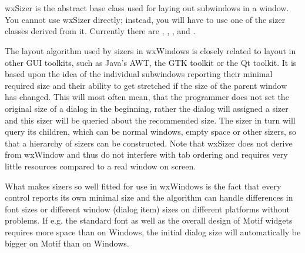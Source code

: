 \section{}\label{wxsizer}

wxSizer is the abstract base class used for laying out subwindows in a window. You
cannot use wxSizer directly; instead, you will have to use one of the sizer
classes derived from it. Currently there are , 
,
,  
and .

The layout algorithm used by sizers in wxWindows is closely related to layout
in other GUI toolkits, such as Java's AWT, the GTK toolkit or the Qt toolkit. It is
based upon the idea of the individual subwindows reporting their minimal required
size and their ability to get stretched if the size of the parent window has changed.
This will most often mean, that the programmer does not set the original size of
a dialog in the beginning, rather the dialog will assigned a sizer and this sizer
will be queried about the recommended size. The sizer in turn will query its
children, which can be normal windows, empty space or other sizers, so that
a hierarchy of sizers can be constructed. Note that wxSizer does not derive from wxWindow
and thus do not interfere with tab ordering and requires very little resources compared
to a real window on screen.

What makes sizers so well fitted for use in wxWindows is the fact that every control
reports its own minimal size and the algorithm can handle differences in font sizes
or different window (dialog item) sizes on different platforms without problems. If e.g.
the standard font as well as the overall design of Motif widgets requires more space than
on Windows, the initial dialog size will automatically be bigger on Motif than on Windows.








